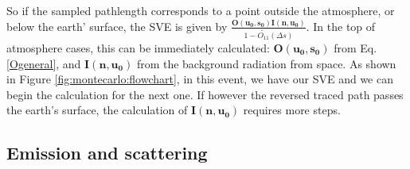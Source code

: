 So if the sampled pathlength corresponds to a point outside the
atmosphere, or below the earth' surface, the SVE is given by
$\frac{\mathbf{O(u_0,s_0)I(n,u_0)}}{1-\tilde{O_{11}}(\Delta s)}$. In the
top of atmosphere cases, this can be immediately calculated:
$\mathbf{O(u_0,s_0)}$ from Eq. \ref{Ogeneral}, and $\mathbf{I(n,u_0)}$ from
  the background radiation from space.  As shown in Figure
  \ref{fig:montecarlo:flowchart}, in this event, we have our SVE and we can begin the calculation for the next
  one.  If however the reversed traced path passes the earth's surface, the
  calculation of $\mathbf{I(n,u_0)}$ requires more steps.

\subsection{Emission and scattering}

